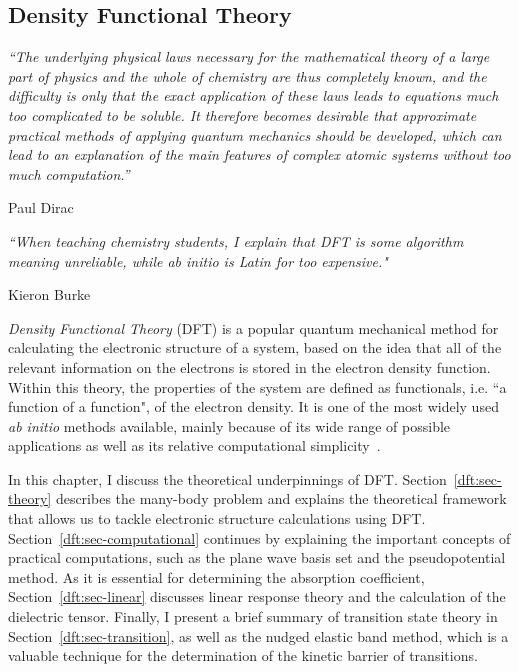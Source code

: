 \begin{refsection}

\chapter{Density Functional Theory}

\setlength{\epigraphwidth}{4in}
\epigraph{\textit{``The underlying physical laws necessary for the mathematical theory of a large part of physics and the whole of chemistry are thus completely known, and the difficulty is only that the exact application of these laws leads to equations much too complicated to be soluble. It therefore becomes desirable that approximate practical methods of applying quantum mechanics should be developed, which can lead to an explanation of the main features of complex atomic systems without too much computation.''}}{Paul Dirac}
\vspace{2em}

\setlength{\epigraphwidth}{4in}
\epigraph{\textit{``When teaching chemistry students, I explain that DFT is some algorithm meaning unreliable, while ab initio is Latin for too expensive."}}{Kieron Burke}
\vspace{3em}

\textit{Density Functional Theory} (DFT) is a popular quantum mechanical method for calculating the electronic structure of a system, based on the idea that all of the relevant information on the electrons is stored in the electron density function. Within this theory, the properties of the system are defined as functionals, i.e. ``a function of a function", of the electron density. It is one of the most widely used \textit{ab initio} methods available, mainly because of its wide range of possible applications as well as its relative computational simplicity~\cite{Martin2004}. 

In this chapter, I discuss the theoretical underpinnings of DFT. Section~\ref{dft:sec-theory} describes the many-body problem and explains the theoretical framework that allows us to tackle electronic structure calculations using DFT. Section~\ref{dft:sec-computational} continues by explaining the important concepts of practical computations, such as the plane wave basis set and the pseudopotential method. As it is essential for determining the absorption coefficient, Section~\ref{dft:sec-linear} discusses linear response theory and the calculation of the dielectric tensor. Finally, I present a brief summary of transition state theory in Section~\ref{dft:sec-transition}, as well as the nudged elastic band method, which is a valuable technique for the determination of the kinetic barrier of transitions. 


\end{refsection}
